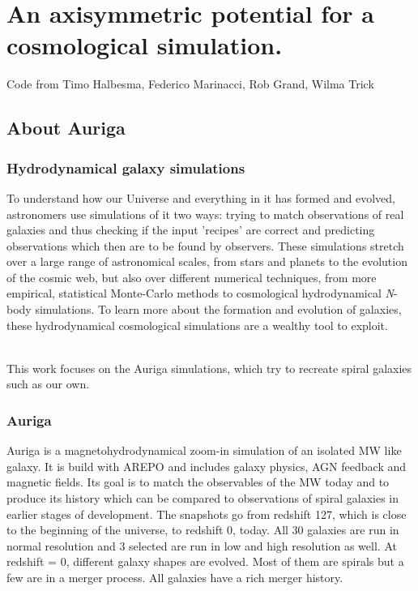 \section{An axisymmetric potential for a cosmological simulation.}
Code from Timo Halbesma, Federico Marinacci, Rob Grand, Wilma Trick


\subsection{About Auriga}\label{subsec:auria}
\subsubsection{Hydrodynamical galaxy simulations}\label{subsubsec:hydro_sim}
To understand how our Universe and everything in it has formed and evolved, astronomers use simulations of it two ways: trying to match observations of real galaxies and thus checking if the input 'recipes' are correct and predicting observations which then are to be found by observers. These simulations stretch over a large range of astronomical scales, from stars and planets to the evolution of the cosmic web, but also over different numerical techniques, from more empirical, statistical Monte-Carlo methods to cosmological hydrodynamical \textit{N}-body simulations. To learn more about the formation and evolution of galaxies, these hydrodynamical cosmological simulations are a wealthy tool to exploit. 

\\This work focuses on the Auriga \citep{AurigaGrand} simulations, which try to recreate spiral galaxies such as our own. 

\subsubsection{Auriga}\label{subsubsec:auriga_intro}
Auriga \citep{AurigaGrand} is a magnetohydrodynamical zoom-in simulation of an isolated \ac{MW} like galaxy. It is build with AREPO \citep{AREPO} and includes galaxy physics, \ac{AGN} feedback and magnetic fields. Its goal is to match the observables of the \ac{MW} today and to produce its history which can be compared to observations of spiral galaxies in earlier stages of development. The snapshots go from redshift 127, which is close to the beginning of the universe, to redshift 0, today. All 30 galaxies are run in normal resolution and 3 selected are run in low and high resolution as well. At redshift = 0, different galaxy shapes are evolved. Most of them are spirals but a few are in a merger process. All galaxies have a rich merger history.


